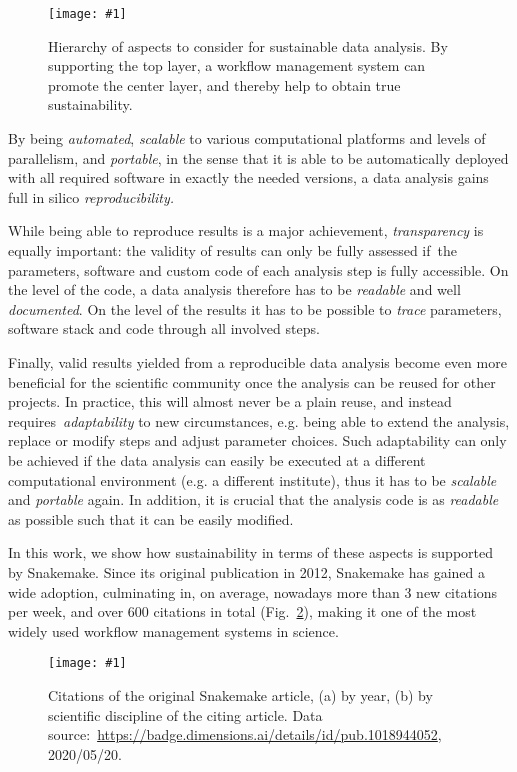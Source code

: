 \documentclass[parskip=half]{scrartcl}
\newcommand{\image}[1]{\centering\texttt{[image: \#1]}}
\let\plainurl\url
\renewcommand{\url}[1]{\protect\plainurl{#1}}
\begin{document}
\begin{figure}
	\image{sustainability-in-wms.pdf}
	\caption{
		Hierarchy of aspects to consider for sustainable data analysis.
		By supporting the top layer, a workflow management system can promote the center layer, and thereby help to obtain true sustainability.
	}\label{fig:sustainability}
\end{figure}

By being \emph{automated}, \emph{scalable} to various computational platforms and levels of parallelism, and \emph{portable}, in the sense that it is able to be automatically deployed with all required software in exactly the needed versions, a data analysis gains full in silico \emph{reproducibility.
}

While being able to reproduce results is a major achievement, \emph{transparency} is equally important: the validity of results can only be fully assessed if~the parameters, software and custom code of each analysis step is fully accessible.
On the level of the code, a data analysis therefore has to be \emph{readable} and well \emph{documented}.
On the level of the results it has to be possible to \emph{trace} parameters, software stack and code through all involved steps.

Finally, valid results yielded from a reproducible data analysis become even more beneficial for the scientific community once the analysis can be reused for other projects.
In practice, this will almost never be a plain reuse, and instead requires~\emph{adaptability} to new circumstances, e.g. being able to extend the analysis, replace or modify steps and adjust parameter choices.
Such adaptability can only be achieved if the data analysis can easily be executed at a different computational environment (e.g. a different institute), thus it has to be \emph{scalable} and \emph{portable} again.
In addition, it is crucial that the analysis code is as \emph{readable} as possible such that it can be easily modified.

In this work, we show how sustainability in terms of these aspects is supported by Snakemake.
Since its original publication in 2012, Snakemake has gained a wide adoption, culminating in, on average, nowadays more than 3 new citations per week, and over 600 citations in total (Fig.~\ref{fig:citations}), making it one of the most widely used workflow management systems in science.

\begin{figure}
	\image{citations.pdf}
	\caption{
		Citations of the original Snakemake article, (a) by year, (b) by scientific discipline of the citing article.
		Data source:~\url{https://badge.dimensions.ai/details/id/pub.1018944052}, 2020/05/20.
	}
	\label{fig:citations}
\end{figure}
\end{document}
